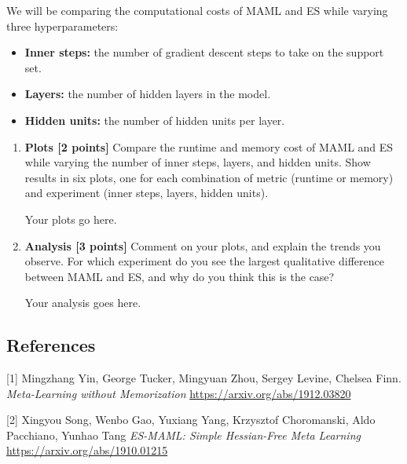 \documentclass[12pt]{article}
\begin{document}
We will be comparing the computational costs of MAML and ES while varying three hyperparameters:
\begin{itemize}
  \item \textbf{Inner steps:} the number of gradient descent steps to take on the support set.
  \item \textbf{Layers:} the number of hidden layers in the model.
  \item \textbf{Hidden units:} the number of hidden units per layer.
\end{itemize}


\begin{enumerate}[label=(\alph*)]
  \item \textbf{Plots [2 points]}
  Compare the runtime and memory cost of MAML and ES while varying the number of inner steps, layers, and hidden units.
  Show results in six plots, one for each combination of metric (runtime or memory) and experiment (inner steps, layers, hidden units).

  {\color{red}
  Your plots go here.
  }
  
% 


  \item \textbf{Analysis [3 points]}
  Comment on your plots, and explain the trends you observe. 
  For which experiment do you see the largest qualitative difference between MAML and ES, and why do you think this is the case?

  {\color{red}
  Your analysis goes here.
  }
\end{enumerate}

\subsection*{References}

[1] 
Mingzhang Yin, George Tucker, Mingyuan Zhou, Sergey Levine, Chelsea Finn.
\textit{Meta-Learning without Memorization}
\url{https://arxiv.org/abs/1912.03820}

[2]
Xingyou Song, Wenbo Gao, Yuxiang Yang, Krzysztof Choromanski, Aldo Pacchiano, Yunhao Tang
\textit{ES-MAML: Simple Hessian-Free Meta Learning}
\url{https://arxiv.org/abs/1910.01215}
\end{document}
